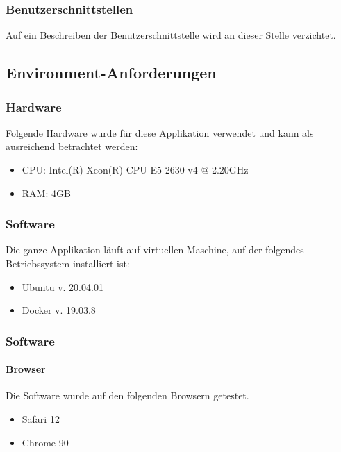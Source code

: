 \subsubsection{Benutzerschnittstellen}
Auf ein Beschreiben der Benutzerschnittstelle wird an dieser Stelle verzichtet. 
\subsection{Environment-Anforderungen}\label{environmentanforderungen}
\subsubsection{Hardware}
Folgende Hardware wurde für diese Applikation verwendet und kann als ausreichend betrachtet werden:
\begin{itemize}
	\item CPU: Intel(R) Xeon(R) CPU E5-2630 v4 @ 2.20GHz
	\item RAM: 4GB
\end{itemize}
\subsubsection{Software}
Die ganze Applikation läuft auf virtuellen Maschine, auf der folgendes Betriebssystem installiert ist:
\begin{itemize}
	\item Ubuntu v. 20.04.01
	\item Docker v. 19.03.8
\end{itemize}
\subsubsection{Software}
\paragraph{Browser}
Die Software wurde auf den folgenden Browsern getestet. 
\begin{itemize}
	\item Safari 12
	\item Chrome 90
\end{itemize}
\newpage